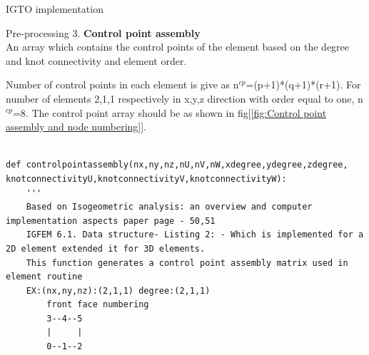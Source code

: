 \documentclass[a4paper,12pt,times]{article}
\begin{document}
\begin{section}{IGTO implementation}
\begin{subsection}{Pre-processing}
3.\textbf{ Control point assembly}\\
An array which contains the control points of the element based on the degree and knot connectivity and element order.
 
Number of control points in each element is give as n$^{cp}$=(p+1)*(q+1)*(r+1).
For number of elements 2,1,1 respectively in x,y,z direction with order equal to one, n$^{cp}$=8. The control point array should be as shown in fig[\ref{fig:Control point assembly and node numbering}].
 

\begin{lstlisting}

def controlpointassembly(nx,ny,nz,nU,nV,nW,xdegree,ydegree,zdegree,
knotconnectivityU,knotconnectivityV,knotconnectivityW):
    '''
    Based on Isogeometric analysis: an overview and computer implementation aspects paper page - 50,51 
    IGFEM 6.1. Data structure- Listing 2: - Which is implemented for a 2D element extended it for 3D elements.
    This function generates a control point assembly matrix used in element routine 
    EX:(nx,ny,nz):(2,1,1) degree:(2,1,1)
        front face numbering
        3--4--5
        |     |
        0--1--2


\end{lstlisting}
\end{subsection}
\end{section}
\end{document}
